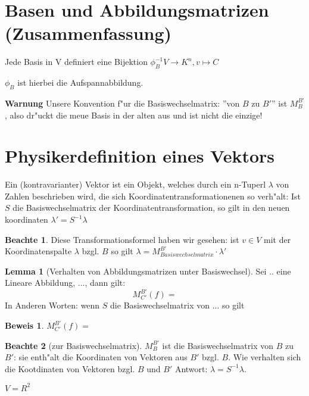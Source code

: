 \documentclass[oneside,fontsize=11pt,paper=a4,BCOR=0mm,DIV=12,automark,headsepline]{scrbook}
\theoremstyle{remark}
\theoremstyle{definition}
\newtheorem*{notte}{Beachte}
\newtheorem{lemma}{Lemma}[section]
\theoremstyle{definition}
\newtheorem*{prof}{Beweis}
\theoremstyle{remark}
\begin{document}
\section{Basen und Abbildungsmatrizen (Zusammenfassung)}
\label{sec:baab}
Jede Basis in V definiert eine Bijektion $\phi_B^{-1}V\rightarrow K^n, v\mapsto C$
\begin{relation}
  $\phi_B$ ist hierbei die Aufspannabbildung.  
\end{relation}

\textbf{Warnung} Unsere Konvention f"ur die Basiswechselmatrix: ''von $B$ zu
$B'$'' ist $M^{B'}_B$, also dr"uckt die meue Basis in der alten aus und ist
nicht die einzige!

\section{Physikerdefinition eines Vektors}
\label{sec:phyv}

Ein (kontravarianter) Vektor ist ein Objekt, welches durch ein n-Tuperl \(\lambda\)
von Zahlen beschrieben wird, die sich Koordinatentransformationenen so
verh"alt: Ist $S$ die Basiswechselmatrix der Koordinatentransformation, so gilt
in den neuen koordinaten $\lambda'=S^{-1}\lambda$

\begin{notte}
  Diese Transformationsformel haben wir gesehen: ist $v\in V$ mit der
  Koordinatenspalte $\lambda$ bzgl. $B$ so gilt
  $\lambda=M^{B'}_{Basiswechselmatrix}\cdot \lambda ' $
\end{notte}

\begin{lemma}[Verhalten von Abbildungsmatrizen unter Basiswechsel]
  Sei .. eine Lineare Abbildung, ..., dann gilt:
  \[
    M^{B'}_{C'}(f)=
  \] In Anderen Worten: wenn $S$ die Basiswechselmatrix von ... so gilt
\end{lemma}

\begin{prof}
  $M^{B'}_{C'}(f)=$
\end{prof}

\begin{notte}[zur Basiswechselmatrix]
  $ M^{B'}_{B}$ ist die Basiswechselmatrix von $B$ zu $B'$: sie enth"alt die
  Koordinaten von Vektoren aus $B'$ bzgl. $B$. Wie verhalten sich die
  Kootdinaten von Vektoren bzgl. $B$ und $B'$ Antwort: $\lambda =
  S^{-1}\lambda$.
\end{notte}

\begin{exa}
  $V=R^{2}$
\end{exa}
\end{document}
